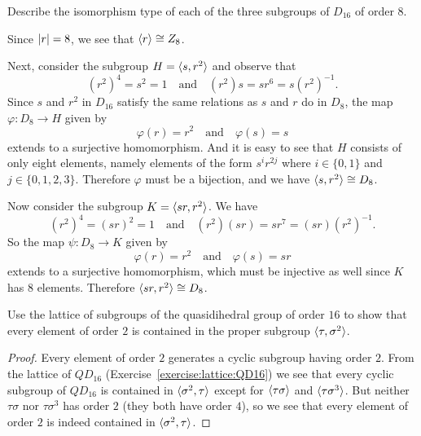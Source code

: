  Describe the isomorphism type of each of the three
subgroups of $D_{16}$ of order $8$.
\begin{solution}
  Since $\lvert{r}\rvert = 8$, we see that $\langle{r}\rangle\cong Z_8$.

  Next, consider the subgroup $H = \langle{s,r^2}\rangle$ and observe that
  \begin{equation*}
    (r^2)^4 = s^2 = 1
    \quad\text{and}\quad
    (r^2)s = sr^6 = s(r^2)^{-1}.
  \end{equation*}
  Since $s$ and $r^2$ in $D_{16}$ satisfy the same relations as $s$
  and $r$ do in $D_8$, the map $\varphi\colon D_8\to H$ given by
  \begin{equation*}
    \varphi(r) = r^2
    \quad\text{and}\quad
    \varphi(s) = s
  \end{equation*}
  extends to a surjective homomorphism. And it is easy to see that $H$
  consists of only eight elements, namely elements of the form
  $s^ir^{2j}$ where $i\in\{0,1\}$ and $j\in\{0,1,2,3\}$. Therefore
  $\varphi$ must be a bijection, and we have $\langle{s,r^2}\rangle\cong D_8$.

  Now consider the subgroup $K = \langle{sr,r^2}\rangle$. We have
  \begin{equation*}
    (r^2)^4 = (sr)^2 = 1
    \quad\text{and}\quad
    (r^2)(sr) = sr^7 = (sr)(r^2)^{-1}.
  \end{equation*}
  So the map $\psi\colon D_8\to K$ given by
  \begin{equation*}
    \varphi(r) = r^2
    \quad\text{and}\quad
    \varphi(s) = sr
  \end{equation*}
  extends to a surjective homomorphism, which must be injective as
  well since $K$ has $8$ elements. Therefore $\langle{sr,r^2}\rangle\cong D_8$.
\end{solution}

 Use the lattice of subgroups of the quasidihedral group
of order $16$ to show that every element of order $2$ is contained in
the proper subgroup $\langle{\tau,\sigma^2}\rangle$.
\begin{proof}
  Every element of order $2$ generates a cyclic subgroup having order
  $2$. From the lattice of $QD_{16}$
  (Exercise~\ref{exercise:lattice:QD16}) we see that every cyclic
  subgroup of $QD_{16}$ is contained in $\langle{\sigma^2,\tau}\rangle$ except
  for $\langle{\tau\sigma}\rangle$ and $\langle{\tau\sigma^3}\rangle$. But neither
  $\tau\sigma$ nor $\tau\sigma^3$ has order $2$ (they both have order
  $4$), so we see that every element of order $2$ is indeed contained
  in $\langle{\sigma^2,\tau}\rangle$.
\end{proof}

